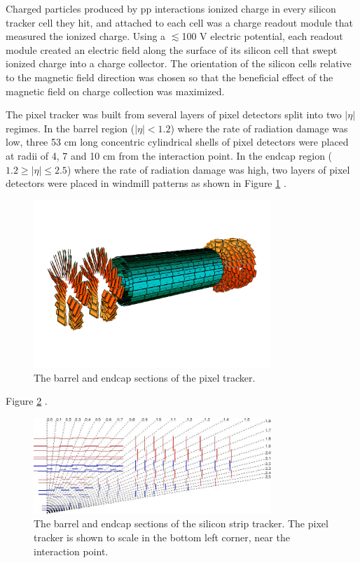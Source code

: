 Charged particles produced by pp interactions ionized charge in every silicon tracker cell they hit, and attached 
to each cell was a charge readout module that measured the ionized charge.  Using a $\lesssim$100 V electric 
potential, each readout module created an electric field along the surface of its silicon cell that swept ionized 
charge into a charge collector.  The orientation of the silicon cells relative to the magnetic field direction 
was chosen so that the beneficial effect of the magnetic field on charge collection was maximized.

The pixel tracker was built from several layers of pixel detectors split into two $|\eta|$ regimes.  In 
the barrel region ($|\eta| < 1.2$) where the rate of radiation damage was low, three 53 cm long concentric 
cylindrical shells of pixel detectors were placed at radii of 4, 7 and 10 cm from the interaction point.  
In the endcap region ($1.2 \geq |\eta| \leq 2.5$) where the rate of radiation damage was high, two layers 
of pixel detectors were placed in windmill patterns as shown in Figure \ref{fig:pixelTracker} \cite{pixelCommissioning}.

\begin{figure}[ht]
	\centering
	\includegraphics[width=0.8\textwidth]{figures/pixelDetectorSchematic.png}
	\caption{The barrel and endcap sections of the pixel tracker.}
	\label{fig:pixelTracker}
\end{figure}


Figure \ref{fig:stripTracker} \cite{cmsTDR}.

\begin{figure}[ht]
	\centering
	\includegraphics[width=0.8\textwidth]{figures/siliconStripAndPixelDetectorTwoDimView.png}
	\caption{The barrel and endcap sections of the silicon strip tracker.  The pixel tracker is shown to scale in the bottom left corner, near 
	the interaction point.}
	\label{fig:stripTracker}
\end{figure}





